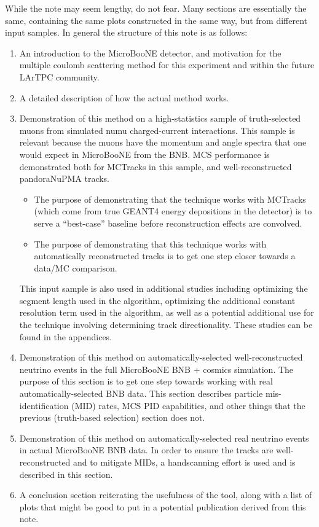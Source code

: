 \documentclass{article}
\begin{document}
While the note may seem lengthy, do not fear. Many sections are essentially the same, containing the same plots constructed in the same way, but from different input samples. In general the structure of this note is as follows:
\begin{enumerate}
\item An introduction to the MicroBooNE detector, and motivation for the multiple coulomb scattering method for this experiment and within the future LArTPC community.
\item A detailed description of how the actual method works.
\item Demonstration of this method on a high-statistics sample of truth-selected muons from simulated numu charged-current interactions. This sample is relevant because the muons have the momentum and angle spectra that one would expect in MicroBooNE from the BNB. MCS performance is demonstrated both for {\sc MCTracks} in this sample, and well-reconstructed pandoraNuPMA tracks. 
\begin{itemize}
	\item The purpose of demonstrating that the technique works with {\sc MCTracks} (which come from true {\sc GEANT4} energy depositions in the detector) is to serve a ``best-case'' baseline before reconstruction effects are convolved. 
	\item The purpose of demonstrating that this technique works with automatically reconstructed tracks is to get one step closer towards a data/MC comparison.
\end{itemize}
This input sample is also used in additional studies including optimizing the segment length used in the algorithm, optimizing the additional constant resolution term used in the algorithm, as well as a potential additional use for the technique involving determining track directionality. These studies can be found in the appendices.
\item Demonstration of this method on automatically-selected well-reconstructed neutrino events in the full MicroBooNE BNB + cosmics simulation. The purpose of this section is to get one step towards working with real automatically-selected BNB data. This section describes particle mis-identification (MID) rates, MCS PID capabilities, and other things that the previous (truth-based selection) section does not.
\item Demonstration of this method on automatically-selected real neutrino events in actual MicroBooNE BNB data. In order to ensure the tracks are well-reconstructed and to mitigate MIDs, a handscanning effort is used and is described in this section.
\item A conclusion section reiterating the usefulness of the tool, along with a list of plots that might be good to put in a potential publication derived from this note.
\end{enumerate}
\end{document}
